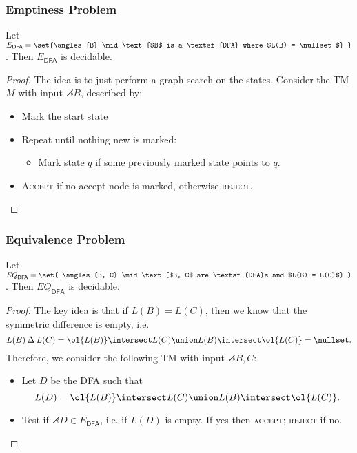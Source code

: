 \documentclass{standalone}
\begin{document}
\subsubsection{Emptiness Problem}
\begin{proposition}
	Let \(E_{\textsf{DFA}} = \set{\angles{B} \mid
		\text{$B$ is a \textsf{DFA} where $L(B) = \nullset$}
	}\). Then \(E_{\textsf{DFA}}\) is decidable.
\end{proposition}
\begin{proof}
	The idea is to just perform a graph search on the states. Consider the \textsf{TM} \(M\) with input \(\angles B\), described by:
	\begin{itemize}
		\item Mark the start state
		\item Repeat until nothing new is marked:
		\begin{itemize}[nosep]
			\item Mark state \(q\) if some previously marked state points to \(q\).
		\end{itemize}
		\item \textsc{Accept} if no accept node is marked, otherwise \textsc{reject}. \qedhere
	\end{itemize}
\end{proof}

\subsubsection{Equivalence Problem}
\begin{proposition}
	Let \(\mathit{EQ}_{\textsf{DFA}} = \set{
		\angles{B, C} \mid \text{$B, C$ are \textsf{DFA}s and $L(B) = L(C)$}
	}\). Then \(EQ_{\textsf{DFA}}\) is decidable.
\end{proposition}
\begin{proof}
	The key idea is that if \(L(B) = L(C)\), then we know that the symmetric difference is empty, i.e.
	\[
		L(B) \mathbin{\Delta} L(C) = \ol{L(B)} \intersect L(C) \union L(B) \intersect \ol{L(C)} = \nullset.
	\]
	Therefore, we consider the following \textsf{TM} with input \(\angles{B, C}\):
	\begin{itemize}
		\item Let \(D\) be the \textsf{DFA} such that
		\[
			L(D) = \ol{L(B)} \intersect L(C) \union L(B) \intersect \ol{L(C)}.
		\]
		\item Test if \(\angles{D} \in E_{\textsf{DFA}}\), i.e. if \(L(D)\) is empty. If yes then \textsc{accept}; \textsc{reject} if no. \qedhere
	\end{itemize}
\end{proof}
\end{document}
